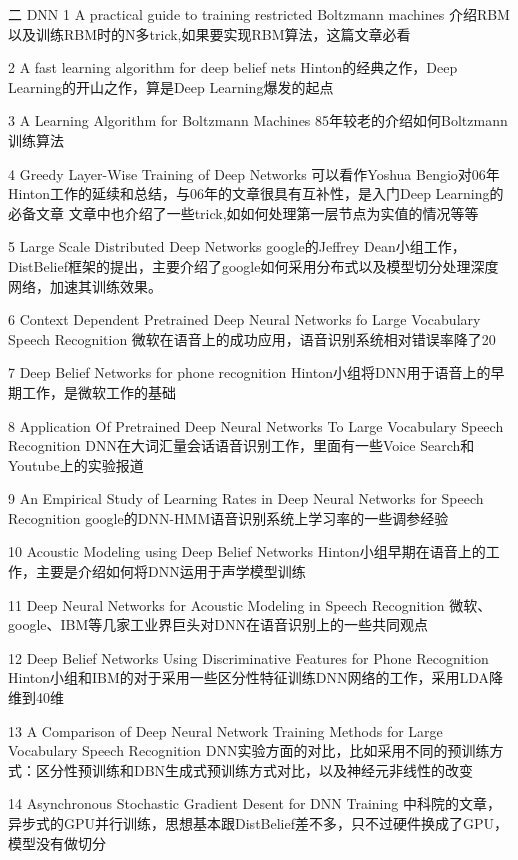 二 DNN
1 A practical guide to training restricted Boltzmann machines
  介绍RBM以及训练RBM时的N多trick,如果要实现RBM算法，这篇文章必看

2 A fast learning algorithm for deep belief nets
  Hinton的经典之作，Deep Learning的开山之作，算是Deep Learning爆发的起点

3 A Learning Algorithm for Boltzmann Machines
  85年较老的介绍如何Boltzmann训练算法

4 Greedy Layer-Wise Training of Deep Networks
  可以看作Yoshua Bengio对06年Hinton工作的延续和总结，与06年的文章很具有互补性，是入门Deep Learning的必备文章
  文章中也介绍了一些trick,如如何处理第一层节点为实值的情况等等

5 Large Scale Distributed Deep Networks
  google的Jeffrey Dean小组工作，DistBelief框架的提出，主要介绍了google如何采用分布式以及模型切分处理深度网络，加速其训练效果。

6 Context Dependent Pretrained Deep Neural Networks fo Large Vocabulary Speech Recognition
  微软在语音上的成功应用，语音识别系统相对错误率降了20%

7 Deep Belief Networks for phone recognition
  Hinton小组将DNN用于语音上的早期工作，是微软工作的基础

8 Application Of Pretrained Deep Neural Networks To Large Vocabulary Speech Recognition
  DNN在大词汇量会话语音识别工作，里面有一些Voice Search和Youtube上的实验报道

9 An Empirical Study of Learning Rates in Deep Neural Networks for Speech Recognition
  google的DNN-HMM语音识别系统上学习率的一些调参经验

10 Acoustic Modeling using Deep Belief Networks
  Hinton小组早期在语音上的工作，主要是介绍如何将DNN运用于声学模型训练

11 Deep Neural Networks for Acoustic Modeling in Speech Recognition
  微软、google、IBM等几家工业界巨头对DNN在语音识别上的一些共同观点

12 Deep Belief Networks Using Discriminative Features for Phone Recognition
  Hinton小组和IBM的对于采用一些区分性特征训练DNN网络的工作，采用LDA降维到40维

13 A Comparison of Deep Neural Network Training Methods for Large Vocabulary Speech Recognition
  DNN实验方面的对比，比如采用不同的预训练方式：区分性预训练和DBN生成式预训练方式对比，以及神经元非线性的改变

14 Asynchronous Stochastic Gradient Desent for DNN Training
  中科院的文章，异步式的GPU并行训练，思想基本跟DistBelief差不多，只不过硬件换成了GPU，模型没有做切分

